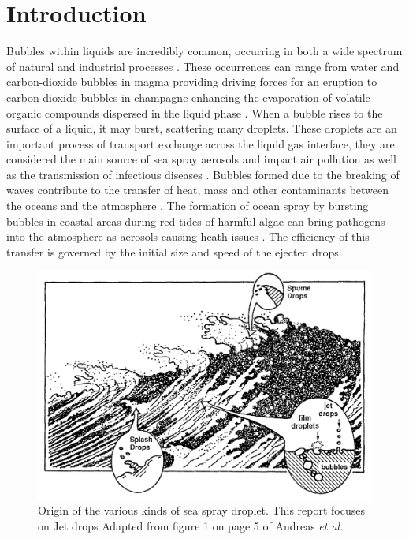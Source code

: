\section{Introduction}

Bubbles within liquids are incredibly common, occurring in both a wide spectrum of natural and industrial processes \cite{veron2015ocean}. These occurrences can range from water and carbon-dioxide bubbles in magma providing driving forces for an eruption \cite{Volcano} to carbon-dioxide bubbles in champagne enhancing the evaporation of volatile organic compounds dispersed in the liquid phase \cite{WINE}. When a bubble rises to the surface of a liquid, it may burst, scattering many droplets. These droplets are an important process of transport exchange across the liquid gas interface, they are considered the main source of sea spray aerosols \cite{veron2015ocean} and impact air pollution \cite{murphy2016depth} as well as the transmission of infectious diseases \cite{ji2022water,bourouiba2021fluid}. Bubbles formed due to the breaking of waves contribute to the transfer of heat, mass and other contaminants between the oceans and the atmosphere \cite{coantic1980mass}. The formation of ocean spray by bursting bubbles in coastal areas during red tides of harmful algae can bring pathogens into the atmosphere as aerosols causing heath issues \cite{walls2014moving}. The efficiency of this transfer is governed by the initial size and speed of the ejected drops. \cite{coantic1980mass,andreas1995spray}

\begin{figure}[H]
    \centering
    \includegraphics[width=0.8\linewidth]{WriteUp/images/Andreas pic.png}
    \caption{Origin of the various kinds of sea spray droplet. This report focuses on Jet drops Adapted from figure 1 on page 5 of Andreas \textit{et al.} \cite{andreas1995spray} }
    \label{fig:0}
\end{figure}

